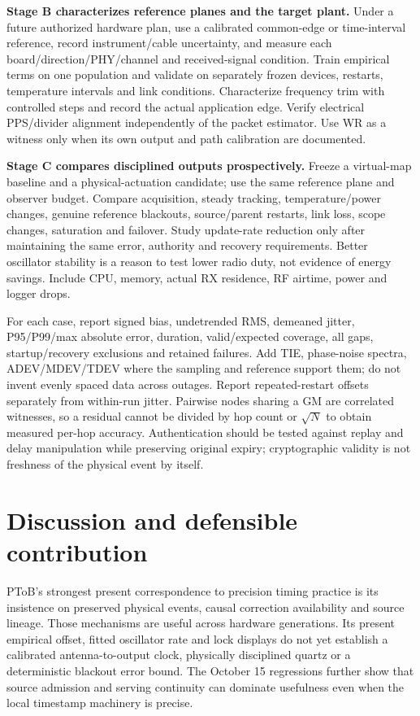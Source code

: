 \documentclass[11pt,letterpaper]{article}
\begin{document}
\textbf{Stage B characterizes reference planes and the target plant.} Under a future authorized hardware plan, use a calibrated common-edge or time-interval reference, record instrument/cable uncertainty, and measure each board/direction/PHY/channel and received-signal condition. Train empirical terms on one population and validate on separately frozen devices, restarts, temperature intervals and link conditions. Characterize frequency trim with controlled steps and record the actual application edge. Verify electrical PPS/divider alignment independently of the packet estimator. Use WR as a witness only when its own output and path calibration are documented.

\textbf{Stage C compares disciplined outputs prospectively.} Freeze a virtual-map baseline and a physical-actuation candidate; use the same reference plane and observer budget. Compare acquisition, steady tracking, temperature/power changes, genuine reference blackouts, source/parent restarts, link loss, scope changes, saturation and failover. Study update-rate reduction only after maintaining the same error, authority and recovery requirements. Better oscillator stability is a reason to test lower radio duty, not evidence of energy savings. Include CPU, memory, actual RX residence, RF airtime, power and logger drops.

For each case, report signed bias, undetrended RMS, demeaned jitter, P95/P99/max absolute error, duration, valid/expected coverage, all gaps, startup/recovery exclusions and retained failures. Add TIE, phase-noise spectra, ADEV/MDEV/TDEV where the sampling and reference support them; do not invent evenly spaced data across outages. Report repeated-restart offsets separately from within-run jitter. Pairwise nodes sharing a GM are correlated witnesses, so a residual cannot be divided by hop count or $\sqrt N$ to obtain measured per-hop accuracy. Authentication should be tested against replay and delay manipulation while preserving original expiry; cryptographic validity is not freshness of the physical event by itself.

\section{Discussion and defensible contribution}
PToB's strongest present correspondence to precision timing practice is its insistence on preserved physical events, causal correction availability and source lineage. Those mechanisms are useful across hardware generations. Its present empirical offset, fitted oscillator rate and lock displays do not yet establish a calibrated antenna-to-output clock, physically disciplined quartz or a deterministic blackout error bound. The October 15 regressions further show that source admission and serving continuity can dominate usefulness even when the local timestamp machinery is precise.
\end{document}
